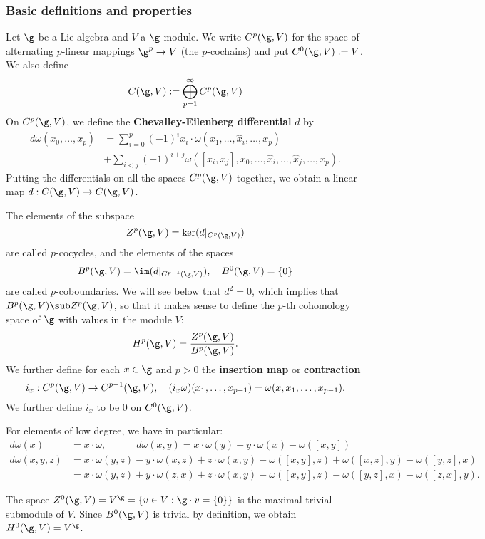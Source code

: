 \subsubsection{Basic definitions and properties}
Let $\g$ be a Lie algebra and $V$ a $\g$-module. We write $C^p(\g,V)$ for the space of alternating $p$-linear mappings $\g^p\to V$ (the $p$-cochains) and put $C^0(\g,V):=V$. We also define
\[C(\g,V):=\bigoplus_{p=1}^{\infty}C^p(\g,V)\]
On $C^p(\g,V)$, we define the \textbf{Chevalley-Eilenberg differential} $d$ by
\begin{align*}
d\omega(x_0,\dots,x_{p})&=\sum_{i=0}^{p}(-1)^ix_i\cdot\omega(x_1,\dots,\widehat{x}_i,\dots,x_{p})\\
&+\sum_{i<j}(-1)^{i+j}\omega([x_i,x_j],x_0,\dots,\widehat{x}_i,\dots,\widehat{x}_j,\dots,x_{p}).
\end{align*}
Putting the differentials on all the spaces $C^p(\g,V)$ together, we obtain a linear map $d:C(\g,V)\to C(\g,V)$.\par
The elements of the subspace
\[Z^p(\g,V)=\ker(d|_{C^p(\g,V)})\]
are called $p$-cocycles, and the elements of the spaces
\[B^p(\g,V)=\im(d|_{C^{p-1}(\g,V)}),\quad B^0(\g,V)=\{0\}\]
are called $p$-coboundaries. We will see below that $d^2=0$, which implies that $B^p(\g,V)\sub Z^p(\g,V)$, so that it makes sense to define the $p$-th cohomology space of $\g$ with values in the module $V$:
\[H^p(\g,V)=\frac{Z^p(\g,V)}{B^p(\g,V)}.\]
We further define for each $x\in\g$ and $p>0$ the \textbf{insertion map} or \textbf{contraction}
\[i_x:C^p(\g,V)\to C^{p-1}(\g,V),\quad(i_x\omega)(x_1,\dots,x_{p-1})=\omega(x,x_1,\dots,x_{p-1}).\]
We further define $i_x$ to be $0$ on $C^0(\g,V)$.
\begin{example}\label{Lie algebra differential low degree}
For elements of low degree, we have in particular:
\begin{align*}
d\omega(x)&=x\cdot\omega,\quad\quad\quad d\omega(x,y)=x\cdot\omega(y)-y\cdot\omega(x)-\omega([x,y])\\
d\omega(x,y,z)&=x\cdot\omega(y,z)-y\cdot\omega(x,z)+z\cdot\omega(x,y)-\omega([x,y],z)+\omega([x,z],y)-\omega([y,z],x)\\
&=x\cdot\omega(y,z)+y\cdot\omega(z,x)+z\cdot\omega(x,y)-\omega([x,y],z)-\omega([y,z],x)-\omega([z,x],y).
\end{align*}
\end{example}
\begin{example}
The space $Z^0(\g,V)=V^\g=\{v\in V:\g\cdot v=\{0\}\}$ is the maximal trivial submodule of $V$. Since $B^0(\g,V)$ is trivial by definition, we obtain $H^0(\g,V)=V^\g$.
\end{example}
